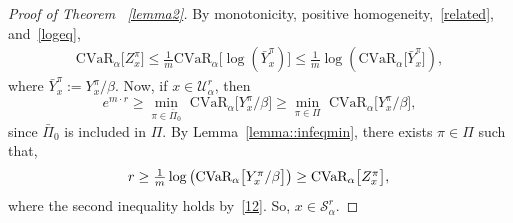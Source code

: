 \documentclass[letterpaper, 10 pt, conference]{ieeeconf}  %
\begin{document}
\begin{proof}[Proof of Theorem ~\ref{lemma2}]
By monotonicity, positive homogeneity,~\eqref{related}, and~\eqref{logeq},
%
\begin{equation}\begin{aligned}
\text{CVaR}_\alpha\big[ Z_x^\pi \big] \leq \textstyle\frac{1}{m} \text{CVaR}_\alpha\big[ \log\left( \bar{Y}_x^\pi \right) \big] 
\leq \textstyle\frac{1}{m} \log \left(\text{CVaR}_\alpha\big[ \bar{Y}_x^\pi \big] \right),
\end{aligned}\label{12}\end{equation}
%
where $\bar{Y}_x^\pi := Y_x^\pi/\beta$. Now, if $x \in \mathcal{U}_\alpha^r$, then
%
\begin{equation*}
e^{m\cdot r} \geq {\underset{\pi \in \bar{\Pi}_0}\min}\text{ CVaR}_\alpha \big[ Y_x^\pi /\beta \big] \geq {\underset{\pi \in \Pi}\min}\text{ CVaR}_\alpha \big[ Y_x^\pi /\beta \big], 
\end{equation*}
%
since $\bar{\Pi}_0$ is included in $\Pi$. By Lemma~\ref{lemma::infeqmin}, there exists $\pi \in \Pi$ such that,
\begin{equation*}
r \geq \textstyle\frac{1}{m}\log \left( \text{CVaR}_\alpha \big[  Y_x^\pi /\beta \big] \right) \geq \text{CVaR}_\alpha\big[ Z_x^\pi \big], \\
\end{equation*}
where the second inequality holds by~\eqref{12}. So, $x \in \mathcal{S}_\alpha^r$.
\end{proof}
\end{document}
